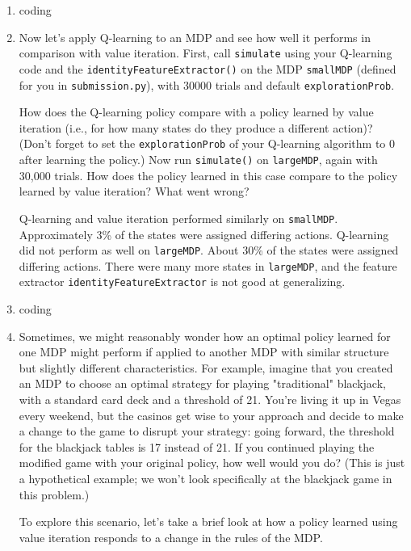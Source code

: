 \documentclass[10pt]{article}
\begin{document}
\begin{enumerate}[label=(\alph*)]

  \item coding
  
  \item Now let's apply Q-learning to an MDP and see how well it performs in comparison with value iteration. First, call \texttt{simulate} using your Q-learning code and the \texttt{identityFeatureExtractor()} on the MDP \texttt{smallMDP} (defined for you in \texttt{submission.py}), with 30000 trials and default \texttt{explorationProb}.
  
  How does the Q-learning policy compare with a policy learned by value iteration (i.e., for how many states do they produce a different action)? (Don't forget to set the \texttt{explorationProb} of your Q-learning algorithm to 0 after learning the policy.) Now run \texttt{simulate()} on \texttt{largeMDP}, again with 30,000 trials. How does the policy learned in this case compare to the policy learned by value iteration? What went wrong?
  
  Q-learning and value iteration performed similarly on \texttt{smallMDP}. Approximately 3\% of the states were assigned differing actions. Q-learning did not perform as well on \texttt{largeMDP}. About 30\% of the states were assigned differing actions. There were many more states in \texttt{largeMDP}, and the feature extractor \texttt{identityFeatureExtractor} is not good at generalizing.
  
  \item coding
  
  \item Sometimes, we might reasonably wonder how an optimal policy learned for one MDP might perform if applied to another MDP with similar structure but slightly different characteristics. For example, imagine that you created an MDP to choose an optimal strategy for playing "traditional" blackjack, with a standard card deck and a threshold of 21. You're living it up in Vegas every weekend, but the casinos get wise to your approach and decide to make a change to the game to disrupt your strategy: going forward, the threshold for the blackjack tables is 17 instead of 21. If you continued playing the modified game with your original policy, how well would you do? (This is just a hypothetical example; we won't look specifically at the blackjack game in this problem.)

	To explore this scenario, let's take a brief look at how a policy learned using value iteration responds to a change in the rules of the MDP.


\end{enumerate}
\end{document}
